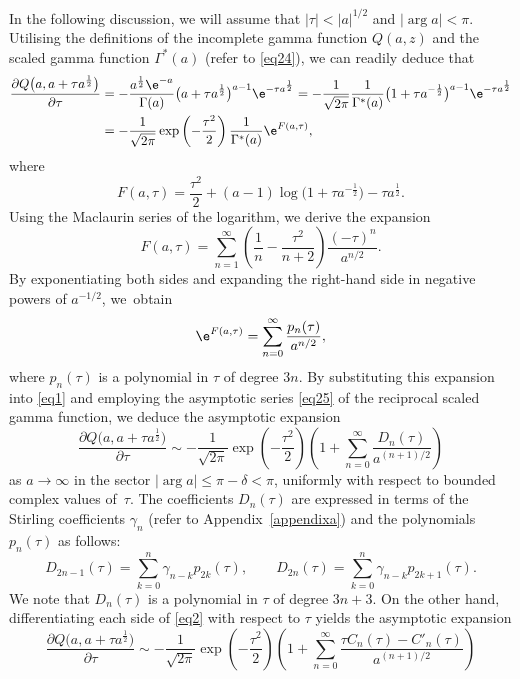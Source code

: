 In the following discussion, we will assume that $|\tau| < |a|^{1/2}$ and $|\arg a| < \pi$. Utilising the definitions of the incomplete gamma function $Q(a,z)$ and the scaled gamma function $\Gamma^\ast (a)$ (refer to \eqref{eq24}), we can readily deduce that
\begin{align}
\frac{\partial Q\big(a,a + \tau a^{\frac{1}{2}}\big)}{\partial \tau} & = - \frac{a^{\frac{1}{2}} \e^{ - a}}{\Gamma (a)}\big( a + \tau a^{\frac{1}{2}} \big)^{a - 1} \e^{ - \tau a^{\frac{1}{2}} } = - \frac{1}{\sqrt{2\pi }}\frac{1}{\Gamma^\ast (a)}\big( 1 + \tau a^{ - \frac{1}{2}}\big)^{a - 1} \e^{ - \tau a^{\frac{1}{2}} }\nonumber \\ & = - \frac{1}{\sqrt {2\pi }}\exp\left( - \frac{\tau^2}{2} \right)\frac{1}{\Gamma^\ast (a)}\e^{F(a,\tau )} ,\label{eq1}
\end{align}
where
\[
F(a,\tau ) = \frac{\tau ^2}{2} + (a - 1)\log \big(1 + \tau a^{-\frac{1}{2}}\big) - \tau a^{\frac{1}{2}} .
\]
Using the Maclaurin series of the logarithm, we derive the expansion
\[
F(a,\tau ) = \sum_{n = 1}^\infty \left( \frac{1}{n}-\frac{\tau^2}{n + 2}\right)\frac{( - \tau )^n}{a^{n/2}} .
\]
By exponentiating both sides and expanding the right-hand side in negative powers of $a^{-1/2}$, we~obtain
\[
\e^{F(a,\tau )} = \sum_{n = 0}^\infty \frac{p_n (\tau )}{a^{n/2} },
\]
where $p_n(\tau)$ is a polynomial in $\tau$ of degree $3n$. By substituting this expansion into \eqref{eq1} and employing the asymptotic series \eqref{eq25} of the reciprocal scaled gamma function, we deduce the asymptotic expansion
\[
\frac{\partial Q\big(a,a + \tau a^{\frac{1}{2}}\big)}{\partial \tau} \sim - \frac{1}{\sqrt{2\pi}}\exp \left(- \frac{\tau^2}{2}\right)\left( 1 + \sum_{n = 0}^\infty \frac{D_n (\tau )}{a^{(n + 1)/2}} \right)
\]
as $a\to \infty$ in the sector $|\arg a| \le \pi-\delta<\pi$, uniformly with respect to bounded complex values of~$\tau$. The coefficients $D_n(\tau)$ are expressed in terms of the Stirling coefficients $\gamma_n$ (refer to Appendix~\ref{appendixa}) and the polynomials $p_n(\tau)$ as follows:
\begin{equation}\label{eq4}
D_{2n - 1} (\tau ) = \sum_{k = 0}^n \gamma _{n - k} p_{2k} (\tau ) ,\qquad D_{2n} (\tau ) = \sum_{k = 0}^n \gamma _{n - k} p_{2k + 1} (\tau ).
\end{equation}
We note that $D_n(\tau)$ is a polynomial in $\tau$ of degree $3n+3$. On the other hand, differentiating each side of \eqref{eq2} with respect to $\tau$ yields the asymptotic expansion
\[
\frac{\partial Q\big(a,a + \tau a^{\frac{1}{2}}\big)}{\partial \tau} \sim - \frac{1}{\sqrt {2\pi }}\exp \left( - \frac{\tau^2}{2}\right)\left( 1 + \sum_{n = 0}^\infty \frac{\tau C_n (\tau ) - C'_n (\tau )}{a^{(n + 1)/2}} \right)
\]
